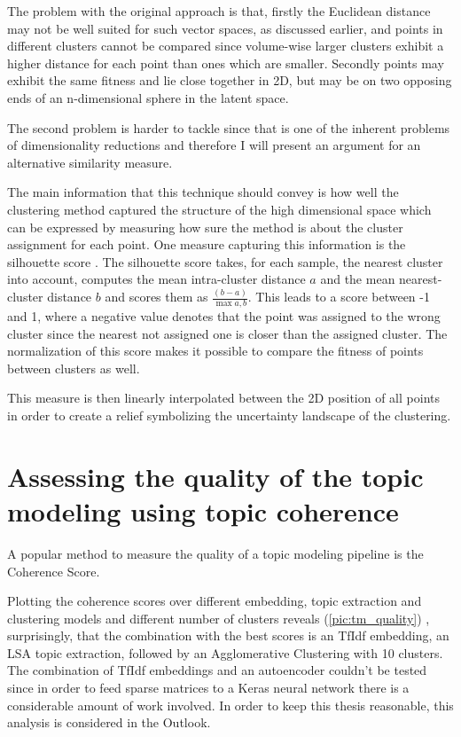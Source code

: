 The problem with the original approach is that, firstly the Euclidean distance may not be well suited for such vector spaces, as discussed earlier, and points in different clusters cannot be compared since volume-wise larger clusters exhibit a higher distance for each point than ones which are smaller. Secondly points may exhibit the same fitness and lie close together in 2D, but may be on two opposing ends of an n-dimensional sphere in the latent space. 

The second problem is harder to tackle since that is one of the inherent problems of dimensionality reductions and therefore I will present an argument for an alternative similarity measure.

The main information that this technique should convey is how well the clustering method captured the structure of the high dimensional space which can be expressed by measuring how sure the method is about the cluster assignment for each point. One measure capturing this information is the silhouette score \cite{rousseeuwSilhouettesGraphicalAid1987}. The silhouette score takes, for each sample, the nearest cluster into account, computes the mean intra-cluster distance $a$ and the mean nearest-cluster distance $b$ and scores them as $\frac{(b-a)}{\max{a,b}}$. This leads to a score between -1 and 1, where a negative value denotes that the point was assigned to the wrong cluster since the nearest not assigned one is closer than the assigned cluster. The normalization of this score makes it possible to compare the fitness of points between clusters as well. 

This measure is then linearly interpolated between the 2D position of all points in order to create a relief symbolizing the uncertainty landscape of the clustering.


\section{Assessing the quality of the topic modeling using topic coherence}

A popular method to measure the quality of a topic modeling pipeline is the Coherence Score. 

Plotting the coherence scores over different embedding, topic extraction and clustering models and different number of clusters reveals (\autoref{pic:tm_quality}) , surprisingly, that the combination with the best scores is an TfIdf embedding, an LSA topic extraction, followed by an Agglomerative Clustering with 10 clusters. The combination of TfIdf embeddings and an autoencoder couldn't be tested since in order to feed sparse matrices to a Keras neural network there is a considerable amount of work involved. In order to keep this thesis reasonable, this analysis is considered in the Outlook.

